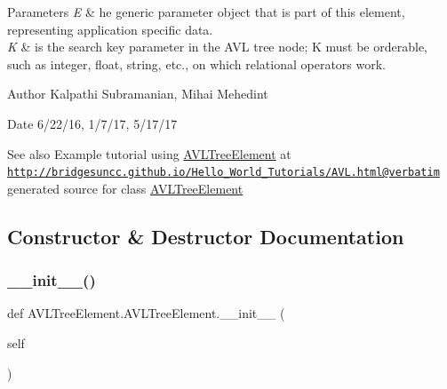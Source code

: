 \begin{DoxyParams}{Parameters}
{\em E} & he generic parameter object that is part of this element, representing application specific data. \\
\hline
{\em K} & is the search key parameter in the A\+VL tree node; K must be orderable, such as integer, float, string, etc., on which relational operators work.\\
\hline
\end{DoxyParams}
\begin{DoxyAuthor}{Author}
Kalpathi Subramanian, Mihai Mehedint
\end{DoxyAuthor}
\begin{DoxyDate}{Date}
6/22/16, 1/7/17, 5/17/17
\end{DoxyDate}
\begin{DoxySeeAlso}{See also}
Example tutorial using \hyperlink{class_a_v_l_tree_element_1_1_a_v_l_tree_element}{A\+V\+L\+Tree\+Element} at ~\newline
 \href{http://bridgesuncc.github.io/Hello_World_Tutorials/AVL.html@verbatim}{\tt http\+://bridgesuncc.\+github.\+io/\+Hello\+\_\+\+World\+\_\+\+Tutorials/\+A\+V\+L.\+html@verbatim} generated source for class \hyperlink{class_a_v_l_tree_element_1_1_a_v_l_tree_element}{A\+V\+L\+Tree\+Element}  
\end{DoxySeeAlso}


\subsection{Constructor \& Destructor Documentation}
\hypertarget{class_a_v_l_tree_element_1_1_a_v_l_tree_element_a8e6be662898e513509f1d10368efa8da}{}\label{class_a_v_l_tree_element_1_1_a_v_l_tree_element_a8e6be662898e513509f1d10368efa8da} 
\subsubsection{\texorpdfstring{\+\_\+\+\_\+init\+\_\+\+\_\+()}{\_\_init\_\_()}}
{\footnotesize\ttfamily def A\+V\+L\+Tree\+Element.\+A\+V\+L\+Tree\+Element.\+\_\+\+\_\+init\+\_\+\+\_\+ (\begin{DoxyParamCaption}\item[{}]{self }\end{DoxyParamCaption})}



